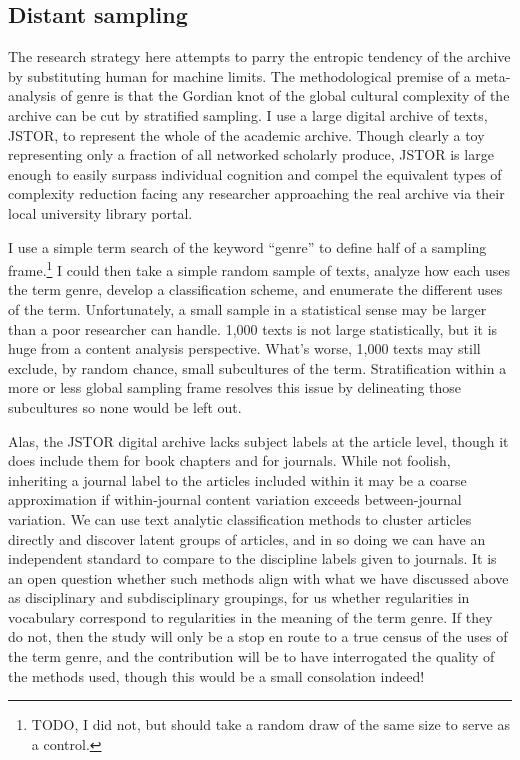 \documentclass[]{book}
\let\rmarkdownfootnote\footnote%
\def\footnote{\protect\rmarkdownfootnote}
\theoremstyle{definition}
\theoremstyle{definition}
\theoremstyle{definition}
\theoremstyle{remark}
\begin{document}
\hypertarget{distant-sampling}{%
\subsection{Distant sampling}\label{distant-sampling}}

The research strategy here attempts to parry the entropic tendency of
the archive by substituting human for machine limits. The methodological
premise of a meta-analysis of genre is that the Gordian knot of the
global cultural complexity of the archive can be cut by stratified
sampling. I use a large digital archive of texts, JSTOR, to represent
the whole of the academic archive. Though clearly a toy representing
only a fraction of all networked scholarly produce, JSTOR is large
enough to easily surpass individual cognition and compel the equivalent
types of complexity reduction facing any researcher approaching the real
archive via their local university library portal.

I use a simple term search of the keyword ``genre'' to define half of a
sampling frame.\footnote{TODO, I did not, but should take a random draw
  of the same size to serve as a control.} I could then take a simple
random sample of texts, analyze how each uses the term genre, develop a
classification scheme, and enumerate the different uses of the term.
Unfortunately, a small sample in a statistical sense may be larger than
a poor researcher can handle. 1,000 texts is not large statistically,
but it is huge from a content analysis perspective. What's worse, 1,000
texts may still exclude, by random chance, small subcultures of the
term. Stratification within a more or less global sampling frame
resolves this issue by delineating those subcultures so none would be
left out.

Alas, the JSTOR digital archive lacks subject labels at the article
level, though it does include them for book chapters and for journals.
While not foolish, inheriting a journal label to the articles included
within it may be a coarse approximation if within-journal content
variation exceeds between-journal variation. We can use text analytic
classification methods to cluster articles directly and discover latent
groups of articles, and in so doing we can have an independent standard
to compare to the discipline labels given to journals. It is an open
question whether such methods align with what we have discussed above as
disciplinary and subdisciplinary groupings, for us whether regularities
in vocabulary correspond to regularities in the meaning of the term
genre. If they do not, then the study will only be a stop en route to a
true census of the uses of the term genre, and the contribution will be
to have interrogated the quality of the methods used, though this would
be a small consolation indeed!
\end{document}
